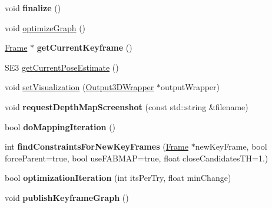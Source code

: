 \begin{DoxyCompactItemize}
\item 
\hypertarget{classlsd__slam_1_1_slam_system_a7514826f9920f14509ab402a5514e806}{void {\bfseries finalize} ()}\label{classlsd__slam_1_1_slam_system_a7514826f9920f14509ab402a5514e806}

\item 
void \hyperlink{classlsd__slam_1_1_slam_system_afaba440ddcefadb3f2f63f49f9f35ce5}{optimize\-Graph} ()
\item 
\hypertarget{classlsd__slam_1_1_slam_system_aa7b982c6fedebeffb6e1f29710dad901}{\hyperlink{classlsd__slam_1_1_frame}{Frame} $\ast$ {\bfseries get\-Current\-Keyframe} ()}\label{classlsd__slam_1_1_slam_system_aa7b982c6fedebeffb6e1f29710dad901}

\item 
S\-E3 \hyperlink{classlsd__slam_1_1_slam_system_aacbca2b7e2a9abb363ff31ab65cb1be9}{get\-Current\-Pose\-Estimate} ()
\item 
void \hyperlink{classlsd__slam_1_1_slam_system_a3e42198c83b0bc44bef086dd77647535}{set\-Visualization} (\hyperlink{classlsd__slam_1_1_output3_d_wrapper}{Output3\-D\-Wrapper} $\ast$output\-Wrapper)
\item 
\hypertarget{classlsd__slam_1_1_slam_system_a7544b1a81677f688a8513701927a3b9f}{void {\bfseries request\-Depth\-Map\-Screenshot} (const std\-::string \&filename)}\label{classlsd__slam_1_1_slam_system_a7544b1a81677f688a8513701927a3b9f}

\item 
\hypertarget{classlsd__slam_1_1_slam_system_a47e5085f186de2ad8b7f16544cf47345}{bool {\bfseries do\-Mapping\-Iteration} ()}\label{classlsd__slam_1_1_slam_system_a47e5085f186de2ad8b7f16544cf47345}

\item 
\hypertarget{classlsd__slam_1_1_slam_system_a8febc788522b3335f7188166d68a31fc}{int {\bfseries find\-Constraints\-For\-New\-Key\-Frames} (\hyperlink{classlsd__slam_1_1_frame}{Frame} $\ast$new\-Key\-Frame, bool force\-Parent=true, bool use\-F\-A\-B\-M\-A\-P=true, float close\-Candidates\-T\-H=1.)}\label{classlsd__slam_1_1_slam_system_a8febc788522b3335f7188166d68a31fc}

\item 
\hypertarget{classlsd__slam_1_1_slam_system_a5451ba373870cc1a77365032550561af}{bool {\bfseries optimization\-Iteration} (int its\-Per\-Try, float min\-Change)}\label{classlsd__slam_1_1_slam_system_a5451ba373870cc1a77365032550561af}

\item 
\hypertarget{classlsd__slam_1_1_slam_system_aa993d7baa046789a59619d1363947dd7}{void {\bfseries publish\-Keyframe\-Graph} ()}\label{classlsd__slam_1_1_slam_system_aa993d7baa046789a59619d1363947dd7}


\end{DoxyCompactItemize}
